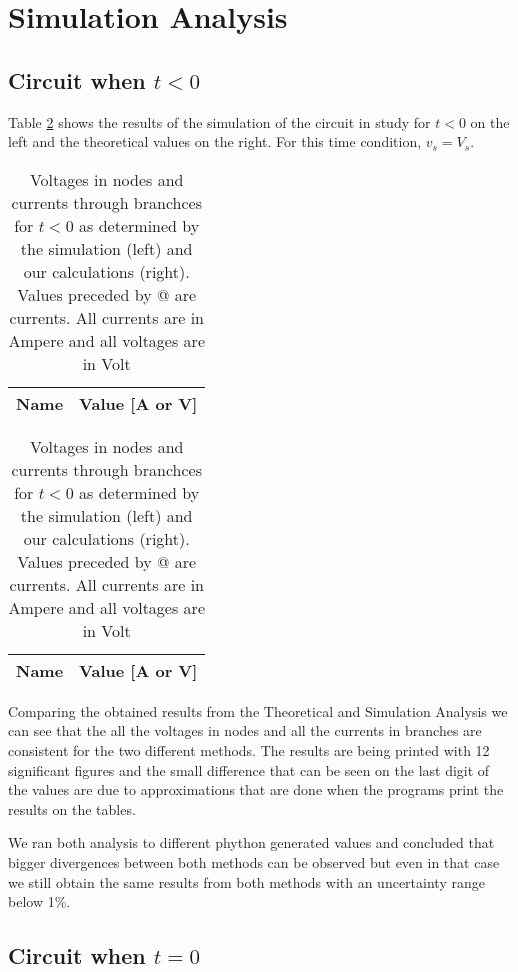 \section{Simulation Analysis}
\label{sec:simulation}

\subsection{Circuit when $t<0$}

Table \ref{tab:comparison1} shows the results of the simulation of the circuit in study for $t<0$ on the left and the theoretical values on the right. For this time condition, $v_s = V_s$.

\begin{table}[H]
  \centering
  \begin{tabular}{|c|c|}
    \hline    
    {\bf Name} & {\bf Value [A or V]} \\ \hline
    
  \end{tabular}
  \begin{tabular}{|c|c|}
    \hline    
    {\bf Name} & {\bf Value [A or V]} \\ \hline
    
  \end{tabular}
  \caption{Voltages in nodes and currents through branchces for $t<0$ as determined by the simulation (left) and our calculations (right). Values preceded by @ are currents. All currents are in Ampere and all voltages are in Volt}
  \label{tab:comparison1}
\end{table}

Comparing the obtained results from the Theoretical and Simulation Analysis we can see that the all the voltages in nodes and all the currents in branches are consistent for the two different methods. The results are being printed with 12 significant figures and the small difference that can be seen on the last digit of the values are due to approximations that are done when the programs print the results on the tables.


We ran both analysis to different phython generated values and concluded that bigger divergences between both methods can be observed but even in that case we still obtain the same results from both methods with an uncertainty range below 1\%. 

\subsection{Circuit when $t=0$}


